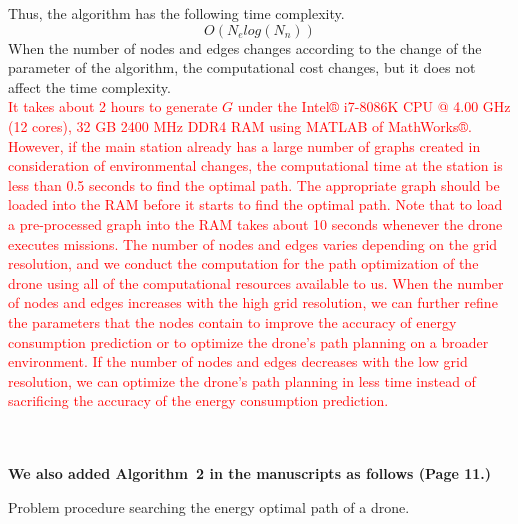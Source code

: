 \documentclass[onecolumn]{IEEEconf}
\begin{document}
\begin{description}
\begin{mdframed} [linewidth=.75pt, userdefinedwidth=0.9\textwidth]
{    Thus, the algorithm has the following time complexity.
    \begin{equation*}
    O(N_elog(N_n)) \tag{6.3} \label{eq:complexity}
    \end{equation*}
    When the number of nodes and edges changes according to the change of the parameter of the algorithm, the computational cost changes, but it does not affect the time complexity.
    }
    ~\\
    \textcolor{red}{
    It takes about 2 hours to generate $G$ under the Intel® i7-8086K CPU @ 4.00 GHz (12 cores), 32 GB 2400 MHz DDR4 RAM using MATLAB of MathWorks®. 
    However, if the main station already has a large number of graphs created in consideration of environmental changes, the computational time at the station is less than 0.5 seconds to find the optimal path. The appropriate graph should be loaded into the RAM before it starts to find the optimal path. Note that to load a pre-processed graph into the RAM takes about 10 seconds whenever the drone executes missions. 
    The number of nodes and edges varies depending on the grid resolution, and we conduct the computation for the path optimization of the drone using all of the computational resources available to us. When the number of nodes and edges increases with the high grid resolution, we can further refine the parameters that the nodes contain to improve the accuracy of energy consumption prediction or to optimize the drone’s path planning on a broader environment.
    If the number of nodes and edges decreases with the low grid resolution, we can optimize the drone’s path planning in less time instead of sacrificing the accuracy of the energy consumption prediction.}
    \end{mdframed}
    ~\\
    ~\pagebreak ~
    ~\\
	\textbf{We also added Algorithm~2 in the manuscripts as follows (Page 11.)}~\\
	\SetNlSty{}{\color{red}}{:}
    \SetAlFnt{\color{red}}
    \setcounter{algocf}{1}
    \begin{algorithm}[h]
    \caption{Problem procedure searching the energy optimal path of a drone.}
    \KwIn{\\
    \hskip1.5em $G$ // A created graph  \\
    \hskip1.5em $n_s$ // A source node  \\
    \hskip1.5em $n_d$ // A destination node 
    }
    \KwOut{\\
}
\end{algorithm}
\end{description}
\end{document}
